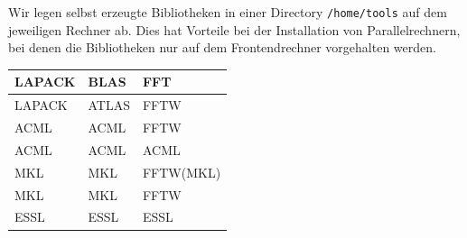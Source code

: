 \documentclass[a4paper,10pt]{report}
\newcommand{\mytt}[1]{{\tt #1}}
\begin{document}
Wir legen selbst erzeugte Bibliotheken in einer Directory
\mytt{/home/tools} auf dem jeweiligen Rechner ab. Dies hat Vorteile
bei der Installation von Parallelrechnern, bei denen die Bibliotheken
nur auf dem Frontendrechner vorgehalten werden.

\begin{center}
\begin{tabular}{|l|l|l|}
\hline
LAPACK& BLAS & FFT\\
\hline
LAPACK & ATLAS & FFTW\\
ACML & ACML & FFTW\\
ACML & ACML & ACML\\
MKL & MKL & FFTW(MKL)\\
MKL & MKL & FFTW\\
ESSL & ESSL & ESSL\\
\hline
\end{tabular}
\end{center}




\end{document}
